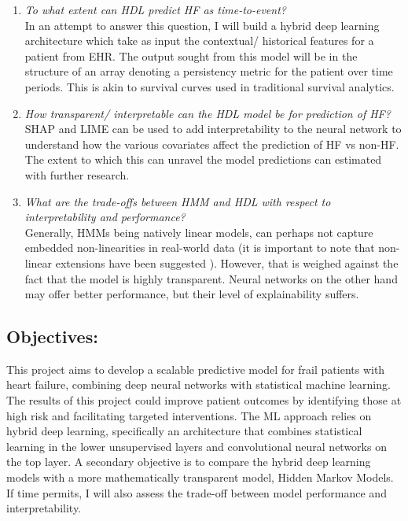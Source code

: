 \documentclass[%
 reprint,
 amsmath,amssymb,
 aps,
 nofootinbib,
]{revtex4-2}
\theoremstyle{definition}
\begin{document}
\begin{enumerate}
\item \textit{To what extent can HDL predict HF as time-to-event?}\\

In an attempt to answer this question, I will build a hybrid deep learning architecture which take as input the contextual/ historical features for a patient from EHR. The output sought from this model will be in the structure of an array denoting a persistency metric for the patient over time periods. This is akin to survival curves used in traditional survival analytics.
\item \textit{How transparent/ interpretable can the HDL model be for prediction of HF?}\\

SHAP and LIME can be used to add interpretability to the neural network to understand how the various covariates affect the prediction of HF vs non-HF. The extent to which this can unravel the model predictions can estimated with further research.

\item \textit{What are the trade-offs between HMM and HDL with respect to interpretability and performance?}\\

Generally, HMMs being natively linear models, can perhaps not capture embedded non-linearities in real-world data (it is important to note that non-linear extensions have been suggested \cite{bobicknonlinear}). However, that is weighed against the fact that the model is highly transparent. Neural networks on the other hand may offer better performance, but their level of explainability suffers.
\end{enumerate}

\subsection{Objectives:}

This project aims to develop a scalable predictive model for frail patients with heart failure, combining deep neural networks with statistical machine learning. The results of this project could improve patient outcomes by identifying those at high risk and facilitating targeted interventions. The ML approach relies on hybrid deep learning, specifically an architecture that combines statistical learning in the lower unsupervised layers and convolutional neural networks on the top layer. A secondary objective is to compare the hybrid deep learning models with a more mathematically transparent model, Hidden Markov Models. If time permits, I will also assess the trade-off between model performance and interpretability.
\end{document}
